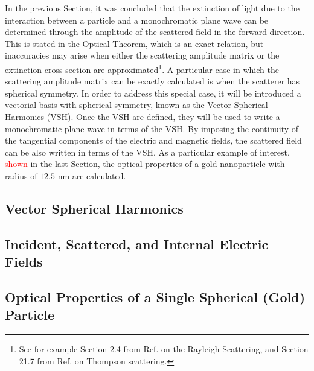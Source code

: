 \documentclass[11pt]{Latex/Classes/PhDthesisPSnPDF}
\begin{document}
     In the previous Section, it was concluded that the extinction of light due to the interaction between a particle and a monochromatic plane wave can be determined through the amplitude of the scattered field in the forward direction. This is stated in the Optical Theorem, which is an exact relation, but inaccuracies may arise when either the scattering amplitude matrix or the extinction cross section are approximated\footnote{See for example Section 2.4 from Ref. \cite{tsang_scattering_2000} on the Rayleigh Scattering, and Section 21.7 from Ref. \cite{zangwill_modern_2013} on Thompson scattering.}. A particular case in which the scattering amplitude matrix can be exactly calculated is when the scatterer has spherical symmetry. In order to address this special case, it will be introduced a vectorial basis with spherical symmetry, known as the Vector Spherical Harmonics (VSH). Once the VSH are defined, they will be used to write a monochromatic plane wave in terms of the VSH. By imposing the continuity of the tangential components of the electric and magnetic fields, the scattered field can be also written in terms of the VSH. As a particular example of interest, \textcolor{red}{shown} in the last Section, the optical properties of a gold nanoparticle with radius of $12.5$ nm are calculated.


	    \subsection{Vector Spherical Harmonics}
		 \label{ss:VSH}
		 

        \subsection{Incident, Scattered, and Internal Electric Fields}
	     \label{ss:Fields}
         

        \subsection{Optical Properties of a Single Spherical (Gold) Particle}
		 \label{ss:AuMie}
\end{document}
